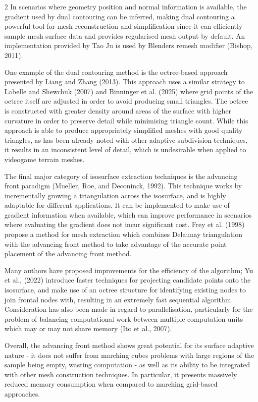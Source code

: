 \documentclass[]{article}
\begin{document}
\begin{multicols}{2}
In scenarios where geometry position and normal information is available, the gradient used by dual contouring can be inferred, making dual contouring a powerful tool for mesh reconstruction and simplification since it can efficiently sample mesh surface data and provides regularised mesh output by default. An implementation provided by Tao Ju is used by Blender\textquotesingle s \textquotesingle remesh\textquotesingle{} modifier (Bishop, 2011).

One example of the dual contouring method is the octree-based approach presented by Liang and Zhang (2013). This approach uses a similar strategy to Labelle and Shewchuk (2007) and Binninger et al. (2025) where grid points of the octree itself are adjusted in order to avoid producing small triangles. The octree is constructed with greater density around areas of the surface with higher curvature in order to preserve detail while minimising triangle count. While this approach is able to produce appropriately simplified meshes with good quality triangles, as has been already noted with other adaptive subdivision techniques, it results in an inconsistent level of detail, which is undesirable when applied to videogame terrain meshes.

The final major category of isosurface extraction techniques is the advancing front paradigm (Mueller, Roe, and Deconinck, 1992). This technique works by incrementally \textquotesingle growing\textquotesingle{} a triangulation across the isosurface, and is highly adaptable for different applications. It can be implemented to make use of gradient information when available, which can improve performance in scenarios where evaluating the gradient does not incur significant cost. Frey et al. (1998) propose a method for mesh extraction which combines Delaunay triangulation with the advancing front method to take advantage of the accurate point placement of the advancing front method.

Many authors have proposed improvements for the efficiency of the algorithm; Yu et al., (2022) introduce faster techniques for projecting candidate points onto the isosurface, and make use of an octree structure for identifying existing nodes to join frontal nodes with, resulting in an extremely fast sequential algorithm. Consideration has also been made in regard to parallelisation, particularly for the problem of balancing computational work between multiple computation units which may or may not share memory (Ito et al., 2007).

Overall, the advancing front method shows great potential for its surface adaptive nature - it does not suffer from marching cubes\textquotesingle{} problems with large regions of the sample being empty, wasting computation - as well as its ability to be integrated with other mesh construction techniques. In particular, it presents massively reduced memory consumption when compared to marching grid-based approaches.


\end{multicols}
\end{document}
